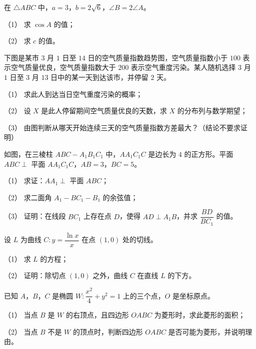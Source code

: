 \begin{question}
在 $\triangle ABC$ 中，$a=3$，$b=2\sqrt6$，$\angle B=2\angle A$。

（1） 求 $\cos A$ 的值；

（2） 求 $c$ 的值。

\Needspace{0.4\textheight}
\end{question}
\begin{question}
下图是某市 $3$ 月 $1$ 日至 $14$ 日的空气质量指数趋势图，空气质量指数小于 $100$ 表示空气质量优良，空气质量指数大于 $200$ 表示空气重度污染。某人随机选择 $3$ 月 $1$ 日至 $3$ 月 $13$ 日中的某一天到达该市，并停留 $2$ 天。
\nopagebreak[4]
\begin{center}\end{center}
\nopagebreak[4]
（1） 求此人到达当日空气重度污染的概率；

（2） 设 $X$ 是此人停留期间空气质量优良的天数，求 $X$ 的分布列与数学期望；

（3） 由图判断从哪天开始连续三天的空气质量指数方差最大？（结论不要求证明）

\Needspace{0.4\textheight}
\end{question}
\begin{question}
如图，在三棱柱 $ABC-A_1B_1C_1$ 中，$AA_1C_1C$ 是边长为 $4$ 的正方形。平面 $ABC\perp$ 平面 $AA_1C_1C$，$AB=3$，$BC=5$。

（1） 求证：$AA_1\perp$ 平面 $ABC$；

（2） 求二面角 $A_1-BC_1-B_1$ 的余弦值；

（3） 证明：在线段 $BC_1$ 上存在点 $D$，使得 $AD\perp A_1B$，并求 $\dfrac{BD}{BC_1}$ 的值。
\nopagebreak[4]
\begin{center}\end{center}
\nopagebreak[4]
\end{question}
\begin{question}
设 $L$ 为曲线 $C:y=\dfrac{\ln x}{x}$ 在点 $(1,0)$ 处的切线。

（1） 求 $L$ 的方程；

（2） 证明：除切点 $(1,0)$ 之外，曲线 $C$ 在直线 $L$ 的下方。

\end{question}
\begin{question}
已知 $A$，$B$，$C$ 是椭圆 $W:\dfrac{x^2}4+y^2=1$ 上的三个点，$O$ 是坐标原点。

（1） 当点 $B$ 是 $W$ 的右顶点，且四边形 $OABC$ 为菱形时，求此菱形的面积；

（2） 当点 $B$ 不是 $W$ 的顶点时，判断四边形 $OABC$ 是否可能为菱形，并说明理由。

\end{question}
